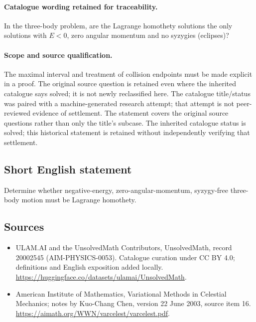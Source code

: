 \documentclass[11pt]{article}
\begin{document}
\paragraph{Catalogue wording retained for traceability.}
In the three-body problem, are the Lagrange homothety solutions the only solutions with $E<0$, zero angular momentum and no syzygies (eclipses)?
\paragraph{Scope and source qualification.}The maximal interval and treatment of collision endpoints must be made explicit in a proof. The original source question is retained even where the inherited catalogue says solved; it is not newly reclassified here. The catalogue title/status was paired with a machine-generated research attempt; that attempt is not peer-reviewed evidence of settlement. The statement covers the original source questions rather than only the title’s subcase. The inherited catalogue status is solved; this historical statement is retained without independently verifying that settlement.
\subsection{Short English statement}
Determine whether negative-energy, zero-angular-momentum, syzygy-free three-body motion must be Lagrange homothety.
\subsection{Sources}
\begin{itemize}
\item[\hypertarget{source:20002545:1}{S1}] ULAM.AI and the UnsolvedMath Contributors, UnsolvedMath, record 20002545 (AIM-PHYSICS-0053). Catalogue curation under CC BY 4.0; definitions and English exposition added locally.
\url{https://huggingface.co/datasets/ulamai/UnsolvedMath}.
\item[\hypertarget{source:20002545:2}{S2}] American Institute of Mathematics, Variational Methods in Celestial Mechanics; notes by Kuo-Chang Chen, version 22 June 2003, source item 16.
\url{https://aimath.org/WWN/varcelest/varcelest.pdf}.
\end{itemize}
\label{end:20002545}
\end{document}
